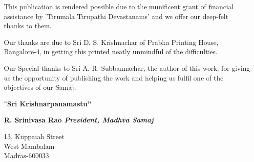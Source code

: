 This publication is rendered possible due to the munificent grant of financial assistance by 'Tirumala Tirupathi Devastanams' and we offer our deep-felt thanks to them.

Our thanks are due to Sri D. S. Krishnachar of Prabha Printing House, Bangalore-4, in getting this printed neatly unmindful of the difficulties.

\eject

Our Special thanks to Sri A. R. Subbannachar, the author of this work, for giving us the opportunity of publishing the work and helping us fulfil one of the objectives of our Samaj.

\begin{center}
\textbf{"Sri Krishnarpanamastu”}
\end{center}

\begin{flushright}
\textbf{R. Srinivasa Rao \textit{President, Madhva Samaj}}
\end{flushright}

\begin{flushleft}
13, Kuppaiah Street \\ West Mambalam \\ Madras-600033
\end{flushleft}

